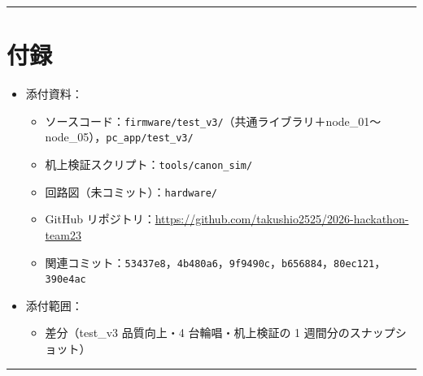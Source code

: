 \documentclass[uplatex,dvipdfmx,a4paper,11pt]{jsarticle}
\newcommand{\sectionrule}{\par\medskip\noindent\rule{\linewidth}{0.6pt}\par\medskip}
\begin{document}
\sectionrule

\section{付録}

\begin{itemize}
  \item 添付資料：
    \begin{itemize}
      \item ソースコード：\texttt{firmware/test\_v3/}（共通ライブラリ＋node\_01〜node\_05），\texttt{pc\_app/test\_v3/}
      \item 机上検証スクリプト：\texttt{tools/canon\_sim/}
      \item 回路図（未コミット）：\texttt{hardware/}
      \item GitHub リポジトリ：\url{https://github.com/takushio2525/2026-hackathon-team23}
      \item 関連コミット：\texttt{53437e8}，\texttt{4b480a6}，\texttt{9f9490c}，\texttt{b656884}，\texttt{80ec121}，\texttt{390e4ac}
    \end{itemize}
  \item 添付範囲：
    \begin{itemize}
      \item 差分（test\_v3 品質向上・4 台輪唱・机上検証の 1 週間分のスナップショット）
    \end{itemize}
\end{itemize}

\sectionrule
\end{document}
